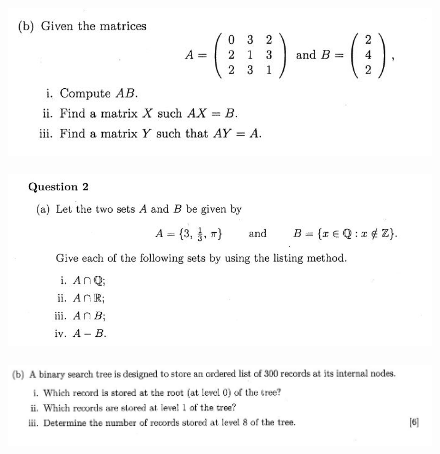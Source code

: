 \documentclass[]{article}
\begin{document}
\newpage
\begin{figure}[h!]
	\centering   
	\includegraphics[width=1.5\linewidth]{"HC 2011 ZA Q10b"}  
\end{figure}
\newpage
\begin{figure}[h!]
	\centering  
	\includegraphics[width=1.5\linewidth]{"HC 2011 ZA Q2a"}
\end{figure}
\newpage
\begin{figure}[h!]
	\centering     
	\includegraphics[width=1.5\linewidth]{"HC 2011 ZA Q7b"}   
\end{figure}
\end{document}
